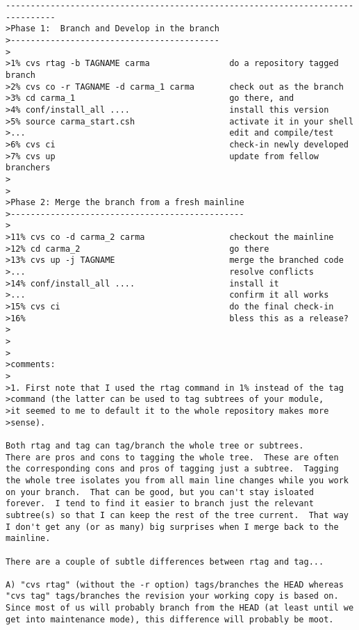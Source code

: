 \documentclass{article}
\begin{document}
\begin{enumerate}
\footnotesize
\begin{verbatim}
--------------------------------------------------------------------------------
>Phase 1:  Branch and Develop in the branch
>------------------------------------------
>
>1% cvs rtag -b TAGNAME carma                do a repository tagged branch
>2% cvs co -r TAGNAME -d carma_1 carma       check out as the branch
>3% cd carma_1                               go there, and
>4% conf/install_all ....                    install this version
>5% source carma_start.csh                   activate it in your shell
>...                                         edit and compile/test
>6% cvs ci                                   check-in newly developed
>7% cvs up                                   update from fellow branchers
>
>
>Phase 2: Merge the branch from a fresh mainline
>-----------------------------------------------
>
>11% cvs co -d carma_2 carma                 checkout the mainline
>12% cd carma_2                              go there
>13% cvs up -j TAGNAME                       merge the branched code
>...                                         resolve conflicts
>14% conf/install_all ....                   install it
>...                                         confirm it all works
>15% cvs ci                                  do the final check-in
>16%                                         bless this as a release?
>
>
>
>comments:
>
>1. First note that I used the rtag command in 1% instead of the tag 
>command (the latter can be used to tag subtrees of your module,
>it seemed to me to default it to the whole repository makes more
>sense).

Both rtag and tag can tag/branch the whole tree or subtrees.
There are pros and cons to tagging the whole tree.  These are often
the corresponding cons and pros of tagging just a subtree.  Tagging
the whole tree isolates you from all main line changes while you work
on your branch.  That can be good, but you can't stay isloated
forever.  I tend to find it easier to branch just the relevant
subtree(s) so that I can keep the rest of the tree current.  That way
I don't get any (or as many) big surprises when I merge back to the
mainline.

There are a couple of subtle differences between rtag and tag...
                                                                                
A) "cvs rtag" (without the -r option) tags/branches the HEAD whereas
"cvs tag" tags/branches the revision your working copy is based on.
Since most of us will probably branch from the HEAD (at least until we
get into maintenance mode), this difference will probably be moot.
                                                                                

\end{verbatim}
\end{enumerate}
\end{document}
